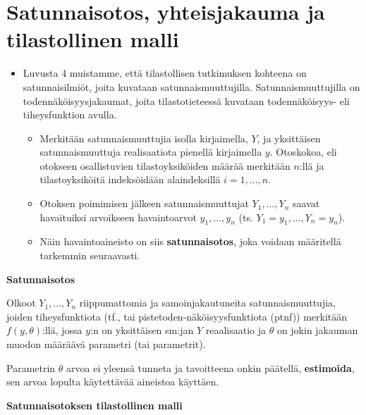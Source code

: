 \documentclass[
]{book}
\providecommand{\tightlist}{%
  \setlength{\itemsep}{0pt}\setlength{\parskip}{0pt}}
\begin{document}
\hypertarget{alaluku61}{%
\section{Satunnaisotos, yhteisjakauma ja tilastollinen malli}\label{alaluku61}}

\begin{itemize}
\tightlist
\item
  Luvusta 4 muistamme, että tilastollisen tutkimuksen kohteena on satunnaisilmiöt, joita kuvataan satunnaismuuttujilla. Satunnaismuuttujilla on todennäköisyysjakaumat, joita tilastotieteessä kuvataan todennäköisyys- eli tiheysfunktion avulla.

  \begin{itemize}
  \tightlist
  \item
    Merkitään satunnaismuuttujia isolla kirjaimella, \(Y\), ja yksittäisen satunnaismuuttuja realisaatiota pienellä kirjaimella \(y\). Otoskokoa, eli otokseen osallistuvien tilastoyksiköiden määrää merkitään \(n\):llä ja tilastoyksiköitä indeksöidään alaindeksillä \(i=1,\ldots,n\).
  \item
    Otoksen poimimisen jälkeen satunnaismuuttujat \(Y_1, \ldots, Y_n\) saavat havaituiksi arvoikseen havaintoarvot \(y_1, \ldots, y_n\) (ts. \(Y_1=y_1, \ldots, Y_n = y_n\)).
  \item
    Näin havaintoaineisto on siis \textbf{satunnaisotos}, joka voidaan määritellä tarkemmin seuraavasti.
  \end{itemize}
\end{itemize}

\begin{noteblock}{}
\textbf{Satunnaisotos}

Olkoot \(Y_1, \ldots, Y_n\) riippumattomia ja samoinjakautuneita satunnaismuuttujia, joiden tiheysfunktiota (tf., tai pistetoden-näköisyysfunktiota (ptnf)) merkitään \(f(y, \theta)\):llä, jossa \(y\):n on yksittäisen sm:jan \(Y\) reaalisaatio ja \(\theta\) on jokin jakauman muodon määräävä parametri (tai parametrit).

Parametrin \(\theta\) arvoa ei yleensä tunneta ja tavoitteena onkin päätellä, \textbf{estimoida}, sen arvoa lopulta käytettävää aineistoa käyttäen.

\end{noteblock}

\hfill\break
\hfill\break
\hfill\break
\hfill\break

\textbf{Satunnaisotoksen tilastollinen malli}
\end{document}
